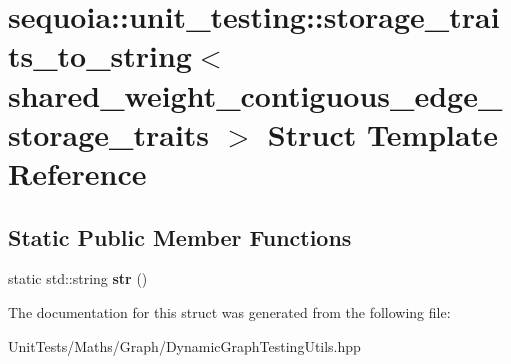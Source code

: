 \hypertarget{structsequoia_1_1unit__testing_1_1storage__traits__to__string_3_01shared__weight__contiguous__edge__storage__traits_01_4}{}\section{sequoia\+::unit\+\_\+testing\+::storage\+\_\+traits\+\_\+to\+\_\+string$<$ shared\+\_\+weight\+\_\+contiguous\+\_\+edge\+\_\+storage\+\_\+traits $>$ Struct Template Reference}
\label{structsequoia_1_1unit__testing_1_1storage__traits__to__string_3_01shared__weight__contiguous__edge__storage__traits_01_4}
\subsection*{Static Public Member Functions}
\begin{DoxyCompactItemize}
\item 
\mbox{\label{structsequoia_1_1unit__testing_1_1storage__traits__to__string_3_01shared__weight__contiguous__edge__storage__traits_01_4_ac1a2d90c69377a960ee70d8ed7051cb5}} 
static std\+::string {\bfseries str} ()
\end{DoxyCompactItemize}


The documentation for this struct was generated from the following file\+:\begin{DoxyCompactItemize}
\item 
Unit\+Tests/\+Maths/\+Graph/Dynamic\+Graph\+Testing\+Utils.\+hpp\end{DoxyCompactItemize}
